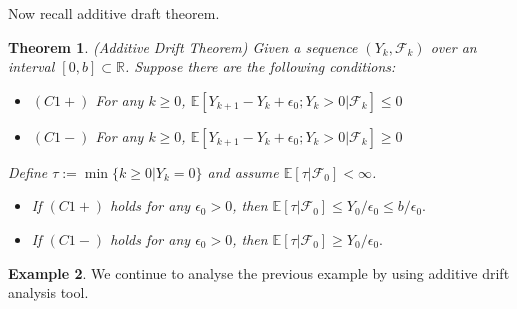 \documentclass[a4paper,11pt]{report}
\theoremstyle{plain} %
\newtheorem{thm}{Theorem}[section]
\theoremstyle{definition} %
\newtheorem{eg}[thm]{Example}
\theoremstyle{remark} %
\begin{document}
\par Now recall additive draft theorem.

\begin{thm}(Additive Drift Theorem) Given a sequence $(Y_{k},\mathcal{F}_{k})$ over an interval $[0,b]\subset \mathbb{R}$.  Suppose there are the following conditions:
\begin{itemize}
    \item $(C1+)$ For any $k\geq 0$, $\mathbb{E}[Y_{k+1}-Y_{k}+\epsilon_{0};Y_{k}>0| \mathcal{F}_{k} ]\leq 0$
    
    \item $(C1-)$ For any $k\geq 0$, $\mathbb{E}[Y_{k+1}-Y_{k}+\epsilon_{0};Y_{k}>0| \mathcal{F}_{k} ]\geq 0$
\end{itemize}
Define $\tau :=\min\{k \geq 0 | Y_{k}=0 \}$ and assume $\mathbb{E}[\tau | \mathcal{F}_{0}]<\infty$. 

\begin{itemize}
    \item If $(C1+)$ holds for any $\epsilon_{0}>0$, then  $\mathbb{E}[\tau | \mathcal{F}_{0}]\leq Y_{0}/ \epsilon_{0} \leq b / \epsilon_{0}.$
     \item If $(C1-)$ holds for any $\epsilon_{0}>0$, then  $\mathbb{E}[\tau | \mathcal{F}_{0}]\geq Y_{0}/ \epsilon_{0}.$
\end{itemize}

\end{thm}


\begin{eg} We continue to analyse the previous example by using additive drift analysis tool. 

\end{eg}
\end{document}
